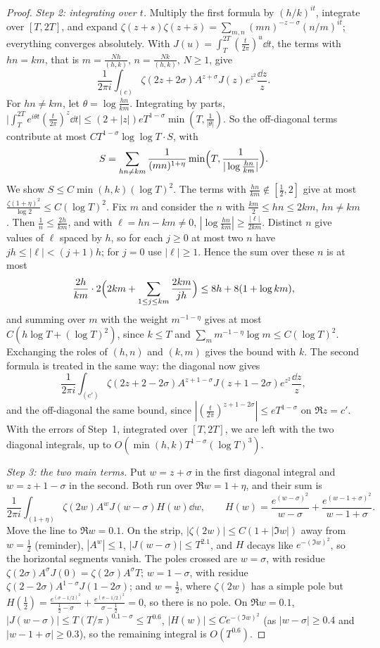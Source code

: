 \begin{proof}
\emph{Step 2: integrating over $t$.} Multiply the first formula by $(h/k)^{it}$, integrate over $[T,2T]$, and expand $\zeta(z+s)\zeta(z+\overline s)=\sum_{m,n}(mn)^{-z-\sigma}(n/m)^{it}$; everything converges absolutely. With $J(u)=\int_T^{2T}(\frac t{2\pi})^u\dd t$, the terms with $hn=km$, that is $m=\frac{Nh}{(h,k)}$, $n=\frac{Nk}{(h,k)}$, $N\ge1$, give
\[
\frac1{2\pi i}\int_{(c)}\zeta(2z+2\sigma)A^{z+\sigma}J(z)e^{z^2}\frac{\dd z}z.
\]
For $hn\ne km$, let $\theta=\log\frac{hn}{km}$. Integrating by parts, $\bigl|\int_T^{2T}e^{i\theta t}(\frac t{2\pi})^z\dd t\bigr|\le(2+|z|)eT^{1-\sigma}\min(T,\frac1{|\theta|})$. So the off-diagonal terms contribute at most $CT^{1-\sigma}\log\log T\cdot S$, with
\[
S=\sum_{hn\ne km}\frac1{(mn)^{1+\eta}}\min\Bigl(T,\frac1{|\log\frac{hn}{km}|}\Bigr).
\]
We show $S\le C\min(h,k)(\log T)^2$. The terms with $\frac{hn}{km}\notin[\frac12,2]$ give at most $\frac{\zeta(1+\eta)^2}{\log2}\le C(\log T)^2$. Fix $m$ and consider the $n$ with $\frac{km}2\le hn\le2km$, $hn\ne km$. Then $\frac1n\le\frac{2h}{km}$, and with $\ell=hn-km\ne0$, $|\log\frac{hn}{km}|\ge\frac{|\ell|}{2km}$. Distinct $n$ give values of $\ell$ spaced by $h$, so for each $j\ge0$ at most two $n$ have $jh\le|\ell|<(j+1)h$; for $j=0$ use $|\ell|\ge1$. Hence the sum over these $n$ is at most
\[
\frac{2h}{km}\cdot2\Bigl(2km+\sum_{1\le j\le km}\frac{2km}{jh}\Bigr)\le8h+8(1+\log km),
\]
and summing over $m$ with the weight $m^{-1-\eta}$ gives at most $C(h\log T+(\log T)^2)$, since $k\le T$ and $\sum_mm^{-1-\eta}\log m\le C(\log T)^2$. Exchanging the roles of $(h,n)$ and $(k,m)$ gives the bound with $k$. The second formula is treated in the same way: the diagonal now gives
\[
\frac1{2\pi i}\int_{(c')}\zeta(2z+2-2\sigma)A^{z+1-\sigma}J(z+1-2\sigma)e^{z^2}\frac{\dd z}z,
\]
and the off-diagonal the same bound, since $|(\frac t{2\pi})^{z+1-2\sigma}|\le eT^{1-\sigma}$ on $\Re z=c'$. With the errors of Step~1, integrated over $[T,2T]$, we are left with the two diagonal integrals, up to $O(\min(h,k)T^{1-\sigma}(\log T)^3)$.

\emph{Step 3: the two main terms.} Put $w=z+\sigma$ in the first diagonal integral and $w=z+1-\sigma$ in the second. Both run over $\Re w=1+\eta$, and their sum is
\[
\frac1{2\pi i}\int_{(1+\eta)}\zeta(2w)A^wJ(w-\sigma)H(w)\dd w,\qquad H(w)=\frac{e^{(w-\sigma)^2}}{w-\sigma}+\frac{e^{(w-1+\sigma)^2}}{w-1+\sigma}.
\]
Move the line to $\Re w=0.1$. On the strip, $|\zeta(2w)|\le C(1+|\Im w|)$ away from $w=\frac12$ (reminder), $|A^w|\le1$, $|J(w-\sigma)|\le T^{2.1}$, and $H$ decays like $e^{-(\Im w)^2}$, so the horizontal segments vanish. The poles crossed are $w=\sigma$, with residue $\zeta(2\sigma)A^\sigma J(0)=\zeta(2\sigma)A^\sigma T$; $w=1-\sigma$, with residue $\zeta(2-2\sigma)A^{1-\sigma}J(1-2\sigma)$; and $w=\frac12$, where $\zeta(2w)$ has a simple pole but $H(\frac12)=\frac{e^{(\sigma-1/2)^2}}{\frac12-\sigma}+\frac{e^{(\sigma-1/2)^2}}{\sigma-\frac12}=0$, so there is no pole. On $\Re w=0.1$, $|J(w-\sigma)|\le T(T/\pi)^{0.1-\sigma}\le T^{0.6}$, $|H(w)|\le Ce^{-(\Im w)^2}$ (as $|w-\sigma|\ge0.4$ and $|w-1+\sigma|\ge0.3$), so the remaining integral is $O(T^{0.6})$.
\end{proof}

